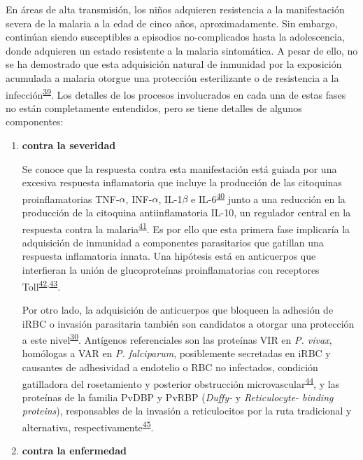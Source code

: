 \documentclass[]{article}
\begin{document}
\begin{enumerate}
\begin{enumerate}
    En áreas de alta transmisión, los niños adquieren resistencia a la
    manifestación severa de la malaria a la edad de cinco años,
    aproximadamente. Sin embargo, continúan siendo susceptibles a
    episodios no-complicados hasta la adolescencia, donde adquieren un
    estado resistente a la malaria sintomática. A pesar de ello, no se
    ha demostrado que esta adquisición natural de inmunidad por la
    exposición acumulada a malaria otorgue una protección esterilizante
    o de resistencia a la
    infección\textsuperscript{\protect\hyperlink{ref-crompton2014rev}{39}}.
    Los detalles de los procesos involucrados en cada una de estas fases
    no están completamente entendidos, pero se tiene detalles de algunos
    componentes:

    \begin{enumerate}
    \def\labelenumiii{\arabic{enumiii}.}
    \item
      \textbf{contra la severidad}

      Se conoce que la respuesta contra esta manifestación está guiada
      por una excesiva respuesta inflamatoria que incluye la producción
      de las citoquinas proinflamatorias TNF-\(\alpha\), INF-\(\alpha\),
      IL-1\(\beta\) e
      IL-6\textsuperscript{\protect\hyperlink{ref-baird2013}{40}} junto
      a una reducción en la producción de la citoquina antiinflamatoria
      IL-10, un regulador central en la respuesta contra la
      malaria\textsuperscript{\protect\hyperlink{ref-jagannathan2014}{41}}.
      Es por ello que esta primera fase implicaría la adquisición de
      inmunidad a componentes parasitarios que gatillan una respuesta
      inflamatoria innata. Una hipótesis está en anticuerpos que
      interfieran la unión de glucoproteínas proinflamatorias con
      receptores
      Toll\textsuperscript{\protect\hyperlink{ref-schofield2006toll}{42},\protect\hyperlink{ref-coban2005toll}{43}}.

      Por otro lado, la adquisición de anticuerpos que bloqueen la
      adhesión de iRBC o invasión parasitaria también son candidatos a
      otorgar una protección a este
      nivel\textsuperscript{\protect\hyperlink{ref-wassmer2015}{30}}.
      Antígenos referenciales son las proteínas VIR en \emph{P. vivax},
      homólogas a VAR en \emph{P. falciparum}, posiblemente secretadas
      en iRBC y causantes de adhesividad a endotelio o RBC no
      infectados, condición gatilladora del rosetamiento y posterior
      obstrucción
      microvascular\textsuperscript{\protect\hyperlink{ref-portillo2001vir}{44}},
      y las proteínas de la familia PvDBP y PvRBP (\emph{Duffy-} y
      \emph{Reticulocyte- binding proteins}), responsables de la
      invasión a reticulocitos por la ruta tradicional y alternativa,
      respectivamente\textsuperscript{\protect\hyperlink{ref-galinski1992rbp}{45}}.
      \newpage
    \item
      \textbf{contra la enfermedad}


\end{enumerate}
\end{enumerate}
\end{enumerate}
\end{document}
